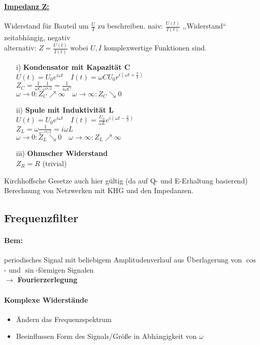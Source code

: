 \documentclass[titlepage,12pt,a4paper,ngerman]{report}
\begin{document}
\paragraph{\underline{Impedanz Z:}}
Widerstand für Bauteil um $ \frac{U}{I} $ zu beschreiben. naiv: $ \frac{U(t)}{I(t)} $ ,,Widerstand`` zeitabhängig, negativ\\
alternativ: $ \boxed{Z = \frac{U(t)}{I(t)}} $ wobei $ U,I $ komplexwertige Funktionen sind.
\begin{itemize}
	\item[i)] \textbf{Kondensator mit Kapazität C}
	$ U(t) = U_0 e^{i \omega t} \quad I(t) = \omega C U_0 r ^{i(\omega t + \frac{\pi}{2})} $\\
	$ \boxed{Z_C = \frac{1}{\omega C} \frac{1}{e^{i \pi/2}} = \frac{1}{i \omega C}} $\\
	$ \omega \rightarrow 0: Z_C \nearrow \infty \quad \omega \rightarrow \infty : Z_C \searrow 0 $
	
	\item[ii)] \textbf{Spule mit Induktivität L}\\
	$ U(t) = U_0 e^{i\omega t} \quad I(t) = \frac{U_0}{\omega L} e^{i (\omega t - \frac{\pi}{2})} $\\
	$\boxed{Z_L = \omega \frac{1}{e^{-i \pi/2}} = i \omega L} $\\
	$ \omega \rightarrow 0 : Z_L \searrow 0 \quad \omega \rightarrow \infty: Z_L \nearrow \infty $
	\item [iii)] \textbf{Ohmscher Widerstand}\\
	$\boxed{ Z_R = R } $ (trivial)
\end{itemize}
Kirchhoffsche Gesetze auch hier gültig (da auf Q- und E-Erhaltung basierend) Berechnung von Netzwerken mit KHG und den Impedanzen. 

\subsection{Frequenzfilter}
\paragraph{Bem:} periodisches Signal mit beliebigem Amplitudenverlauf aus Überlagerung von $ \cos $- und $ \sin $-förmigen Signalen\\
$ \rightarrow $ \textbf{Fourierzerlegung}
\paragraph{Komplexe Widerstände}
\begin{itemize}
	\item Ändern das Frequenzspektrum
	\item Beeinflussen Form des Signals/Größe in Abhängigkeit von $ \omega $
\end{itemize}
\end{document}

